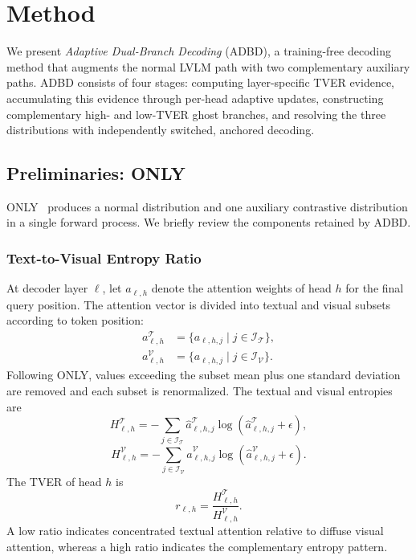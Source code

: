 \section{Method}
\label{sec:method}
We present \emph{Adaptive Dual-Branch Decoding} (ADBD), a training-free decoding method that augments the normal LVLM path with two complementary auxiliary paths. ADBD consists of four stages: computing layer-specific TVER evidence, accumulating this evidence through per-head adaptive updates, constructing complementary high- and low-TVER ghost branches, and resolving the three distributions with independently switched, anchored decoding.

\subsection{Preliminaries: ONLY}

ONLY~\cite{wan2025only} produces a normal distribution and one auxiliary contrastive distribution in a single forward process. We briefly review the components retained by ADBD.

\subsubsection{Text-to-Visual Entropy Ratio}

At decoder layer $\ell$, let $a_{\ell,h}$ denote the attention weights of head $h$ for the final query position. The attention vector is divided into textual and visual subsets according to token position:
\begin{equation}
\begin{aligned}
a_{\ell,h}^{\mathcal{T}} &=
 \{a_{\ell,h,j}\mid j\in\mathcal{I}_{\mathcal{T}}\},\\
a_{\ell,h}^{\mathcal{V}} &=
 \{a_{\ell,h,j}\mid j\in\mathcal{I}_{\mathcal{V}}\}.
\end{aligned}
\end{equation}
Following ONLY, values exceeding the subset mean plus one standard deviation are removed and each subset is renormalized. The textual and visual entropies are
\begin{equation}
H_{\ell,h}^{\mathcal{T}}
=-\sum_{j\in\mathcal{I}_{\mathcal{T}}}
\hat a_{\ell,h,j}^{\mathcal{T}}
\log\!\left(\hat a_{\ell,h,j}^{\mathcal{T}}+\epsilon\right),
\end{equation}
\begin{equation}
H_{\ell,h}^{\mathcal{V}}
=-\sum_{j\in\mathcal{I}_{\mathcal{V}}}
\hat a_{\ell,h,j}^{\mathcal{V}}
\log\!\left(\hat a_{\ell,h,j}^{\mathcal{V}}+\epsilon\right).
\end{equation}
The TVER of head $h$ is
\begin{equation}
r_{\ell,h}
=
\frac{H_{\ell,h}^{\mathcal{T}}}
     {H_{\ell,h}^{\mathcal{V}}}.
\end{equation}
A low ratio indicates concentrated textual attention relative to diffuse visual attention, whereas a high ratio indicates the complementary entropy pattern.

